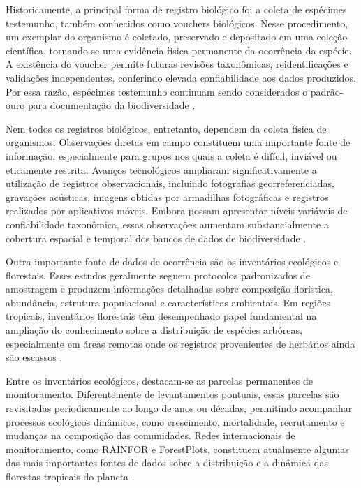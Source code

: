 Historicamente, a principal forma de registro biológico foi a coleta de espécimes testemunho, também conhecidos como vouchers biológicos. Nesse procedimento, um exemplar do organismo é coletado, preservado e depositado em uma coleção científica, tornando-se uma evidência física permanente da ocorrência da espécie. A existência do voucher permite futuras revisões taxonômicas, reidentificações e validações independentes, conferindo elevada confiabilidade aos dados produzidos. Por essa razão, espécimes testemunho continuam sendo considerados o padrão-ouro para documentação da biodiversidade \parencite{funk2018collections}.

Nem todos os registros biológicos, entretanto, dependem da coleta física de organismos. Observações diretas em campo constituem uma importante fonte de informação, especialmente para grupos nos quais a coleta é difícil, inviável ou eticamente restrita. Avanços tecnológicos ampliaram significativamente a utilização de registros observacionais, incluindo fotografias georreferenciadas, gravações acústicas, imagens obtidas por armadilhas fotográficas e registros realizados por aplicativos móveis. Embora possam apresentar níveis variáveis de confiabilidade taxonômica, essas observações aumentam substancialmente a cobertura espacial e temporal dos bancos de dados de biodiversidade \parencite{guisan2017habitat}.

Outra importante fonte de dados de ocorrência são os inventários ecológicos e florestais. Esses estudos geralmente seguem protocolos padronizados de amostragem e produzem informações detalhadas sobre composição florística, abundância, estrutura populacional e características ambientais. Em regiões tropicais, inventários florestais têm desempenhado papel fundamental na ampliação do conhecimento sobre a distribuição de espécies arbóreas, especialmente em áreas remotas onde os registros provenientes de herbários ainda são escassos \parencite{phillips2019rainfor}.

Entre os inventários ecológicos, destacam-se as parcelas permanentes de monitoramento. Diferentemente de levantamentos pontuais, essas parcelas são revisitadas periodicamente ao longo de anos ou décadas, permitindo acompanhar processos ecológicos dinâmicos, como crescimento, mortalidade, recrutamento e mudanças na composição das comunidades. Redes internacionais de monitoramento, como RAINFOR e ForestPlots, constituem atualmente algumas das mais importantes fontes de dados sobre a distribuição e a dinâmica das florestas tropicais do planeta \parencite{malhi2002rainfor,lopezgonzalez2011forestplots}.

